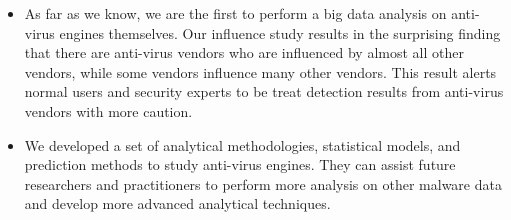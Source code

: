 \vspace{-0.05in}
\begin{itemize}

\item
As far as we know, we are the first to perform a big data analysis on anti-virus engines themselves.
Our influence study results in the surprising finding that there are anti-virus vendors who are influenced by almost all other vendors,
while some vendors influence many other vendors. 
This result alerts normal users and security experts to be treat detection results from anti-virus vendors with more caution.

\item
We developed a set of analytical methodologies, statistical models, and prediction methods to study anti-virus engines.
They can assist future researchers and practitioners to perform more analysis 
on other malware data and develop more advanced analytical techniques.


\end{itemize}
